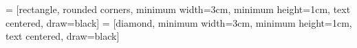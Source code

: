  = [rectangle, rounded corners, minimum width=3cm, minimum height=1cm, text centered, draw=black]
 = [diamond, minimum width=3cm, minimum height=1cm, text centered, draw=black]

\geometry{a4paper, left=2.5cm, right=2.5cm, top=3.5cm, bottom=3cm}

\usepackage{subfiles} %
